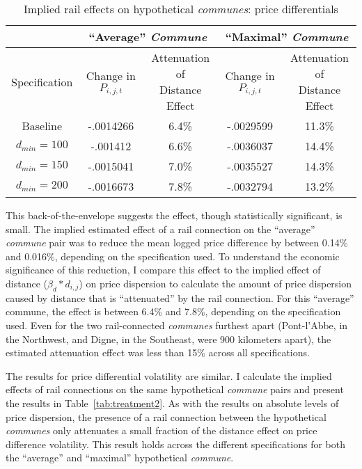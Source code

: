 \documentclass[12pt,twoside]{article}
\begin{document}
\begin{table}[ht]
	\caption{Implied rail effects on hypothetical \emph{communes}: price differentials} \label{tab:treatment1}
	\begin{tabular}{ |c|c|c|c|c| }
		\hline & \multicolumn{2}{c|}{``Average'' \emph{Commune}} & \multicolumn{2}{c|}{``Maximal'' \emph{Commune}} \\ \hline
		Specification & \shortstack{Change in \\ $P_{i,j,t}$} & \shortstack{Attenuation of \\ Distance Effect} & \shortstack{Change in \\ $P_{i,j,t}$} & \shortstack{Attenuation of \\ Distance Effect} \\ \hline
		Baseline & -.0014266 & 6.4\% & -.0029599 & 11.3\% \\
		$d_{min} = 100$ & -.001412 & 6.6\% & -.0036037 & 14.4\% \\
		$d_{min} = 150$ & -.0015041 & 7.0\% & -.0035527 & 14.3\% \\
		$d_{min} = 200$ & -.0016673 & 7.8\% & -.0032794 & 13.2\% \\ \hline
	\end{tabular}
\end{table}

This back-of-the-envelope suggests the effect, though statistically significant, is small.
The implied estimated effect of a rail connection on the ``average'' \emph{commune} pair was to reduce the mean logged price difference by between 0.14\% and 0.016\%, depending on the specification used.
To understand the economic significance of this reduction, I compare this effect to the implied effect of distance ($\beta_d * d_{i,j}$) on price dispersion to calculate the amount of price dispersion caused by distance that is ``attenuated'' by the rail connection.
For this ``average'' commune, the effect is between 6.4\% and 7.8\%, depending on the specification used.
Even for the two rail-connected \emph{communes} furthest apart (Pont-l'Abbe, in the Northwest, and Digne, in the Southeast, were 900 kilometers apart), the estimated attenuation effect was less than 15\% across all specifications.

The results for price differential volatility are similar.
I calculate the implied effects of rail connections on the same hypothetical \emph{commune} pairs and present the results in Table~\ref{tab:treatment2}.
As with the results on absolute levels of price dispersion, the presence of a rail connection between the hypothetical \emph{communes} only attenuates a small fraction of the distance effect on price difference volatility.
This result holds across the different specifications for both the ``average'' and ``maximal'' hypothetical \emph{commune}.
\end{document}
